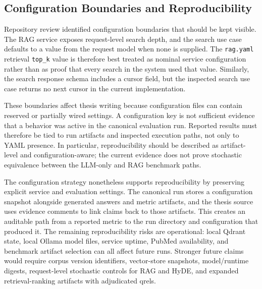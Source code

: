 \subsection{Configuration Boundaries and Reproducibility}

Repository review identified configuration boundaries that should be kept visible. The RAG service exposes request-level search depth, and the search use case defaults to a value from the request model when none is supplied. The \texttt{rag.yaml} retrieval \texttt{top\_k} value is therefore best treated as nominal service configuration rather than as proof that every search in the system used that value. Similarly, the search response schema includes a cursor field, but the inspected search use case returns no next cursor in the current implementation.

These boundaries affect thesis writing because configuration files can contain reserved or partially wired settings. A configuration key is not sufficient evidence that a behavior was active in the canonical evaluation run. Reported results must therefore be tied to run artifacts and inspected execution paths, not only to YAML presence. In particular, reproducibility should be described as artifact-level and configuration-aware; the current evidence does not prove stochastic equivalence between the LLM-only and RAG benchmark paths.

The configuration strategy nonetheless supports reproducibility by preserving explicit service and evaluation settings. The canonical run stores a configuration snapshot alongside generated answers and metric artifacts, and the thesis source uses evidence comments to link claims back to those artifacts. This creates an auditable path from a reported metric to the run directory and configuration that produced it. The remaining reproducibility risks are operational: local Qdrant state, local Ollama model files, service uptime, PubMed availability, and benchmark artifact selection can all affect future runs. Stronger future claims would require corpus version identifiers, vector-store snapshots, model/runtime digests, request-level stochastic controls for RAG and HyDE, and expanded retrieval-ranking artifacts with adjudicated qrels.

